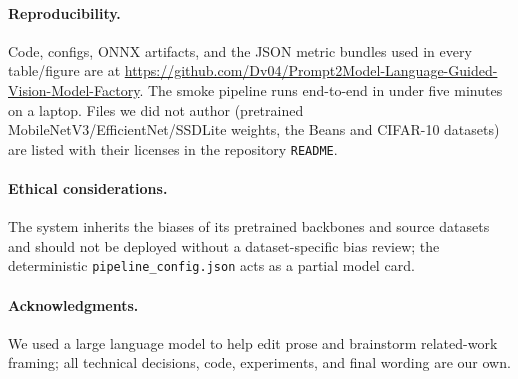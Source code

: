 \documentclass[10pt,twocolumn,letterpaper]{article}
\begin{document}
\paragraph{Reproducibility.} Code, configs, ONNX artifacts, and the
JSON metric bundles used in every table/figure are at
\url{https://github.com/Dv04/Prompt2Model-Language-Guided-Vision-Model-Factory}.
The smoke pipeline runs end-to-end in under five minutes on a laptop.
Files we did not author (pretrained MobileNetV3/EfficientNet/SSDLite
weights, the Beans and CIFAR-10 datasets) are listed with their
licenses in the repository \texttt{README}.

\paragraph{Ethical considerations.} The system inherits the biases of
its pretrained backbones and source datasets and should not be
deployed without a dataset-specific bias review; the deterministic
\texttt{pipeline\_config.json} acts as a partial model card.

\paragraph{Acknowledgments.} We used a large language model to help
edit prose and brainstorm related-work framing; all technical
decisions, code, experiments, and final wording are our own.

    {\tiny
        \setlength{\bibsep}{0pt}
        
        
    }
\end{document}
